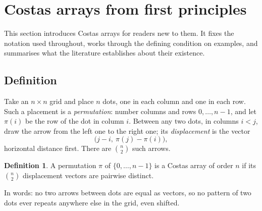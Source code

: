 \documentclass[11pt,a4paper,oneside]{report}
\theoremstyle{definition}
\newtheorem{definition}[theorem]{Definition}
\begin{document}
\section{Costas arrays from first principles}\label{p8-sec:primer}
This section introduces Costas arrays for readers new to them. It fixes the notation used throughout, works through the defining condition on examples, and summarises what the literature establishes about their existence.


\subsection{Definition}

Take an $n\times n$ grid and place $n$ dots, one in each column and one in each row. Such a
placement is a \emph{permutation}: number columns and rows $0,\dots,n-1$, and let $\pi(i)$ be
the row of the dot in column $i$. Between any two dots, in columns $i<j$, draw the arrow from
the left one to the right one; its \emph{displacement} is the vector
\[
\bigl(j-i,\ \pi(j)-\pi(i)\bigr),
\]
horizontal distance first. There are $\binom n2$ such arrows.

\begin{definition}
A permutation $\pi$ of $\{0,\dots,n-1\}$ is a Costas array of order $n$ if its
$\binom n2$ displacement vectors are pairwise distinct.
\end{definition}

In words: no two arrows between dots are equal as vectors, so no pattern of two dots ever
repeats anywhere else in the grid, even shifted.
\end{document}

